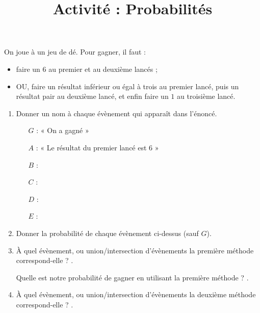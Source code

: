 \documentclass[
	classe=$1^eSTI2D$,
	headerTitle={Probabilités},
	landscape,twocolumn,noheader
]{exercice}
\title{Activité : Probabilités}
\begin{document}
\maketitle


On joue à un jeu de dé. Pour gagner, il faut :
\begin{itemize}
	\item faire un $6$ au premier et au deuxième lancés ;
	\item OU, faire un résultat inférieur ou égal à trois au premier lancé, puis un résultat pair au deuxième lancé, et enfin faire un $1$ au troisième lancé.
\end{itemize}

\begin{enumerate}
	\item Donner un nom à chaque évènement qui apparaît dans l'énoncé.

	      \begin{itemize}
		      \item[$G$] : « On a gagné »
		      \item[$A$] : « Le résultat du premier lancé est $6$ » 
		      \item[$B$] : 
		      \item[$C$] : 
		      \item[$D$] : 
		      \item[$E$] : 
	      \end{itemize}
	\item Donner la probabilité de chaque évènement ci-dessus (sauf $G$).
	\item À quel évènement, ou union/intersection d'évènements la première méthode correspond-elle ? .

	      Quelle est notre probabilité de gagner en utilisant la première méthode ? .
	\item À quel évènement, ou union/intersection d'évènements la deuxième méthode correspond-elle ? .


\end{enumerate}
\end{document}

